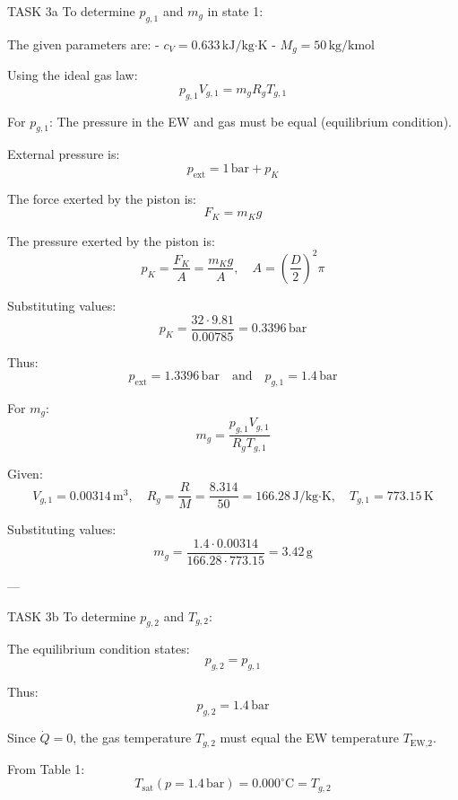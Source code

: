 TASK 3a  
To determine \( p_{g,1} \) and \( m_g \) in state 1:  

The given parameters are:  
- \( c_V = 0.633 \, \text{kJ/kg·K} \)  
- \( M_g = 50 \, \text{kg/kmol} \)  

Using the ideal gas law:  
\[
p_{g,1} V_{g,1} = m_g R_g T_{g,1}
\]  

For \( p_{g,1} \): The pressure in the EW and gas must be equal (equilibrium condition).  

External pressure is:  
\[
p_{\text{ext}} = 1 \, \text{bar} + p_K
\]  

The force exerted by the piston is:  
\[
F_K = m_K g
\]  

The pressure exerted by the piston is:  
\[
p_K = \frac{F_K}{A} = \frac{m_K g}{A}, \quad A = \left(\frac{D}{2}\right)^2 \pi
\]  

Substituting values:  
\[
p_K = \frac{32 \cdot 9.81}{0.00785} = 0.3396 \, \text{bar}
\]  

Thus:  
\[
p_{\text{ext}} = 1.3396 \, \text{bar} \quad \text{and} \quad p_{g,1} = 1.4 \, \text{bar}
\]  

For \( m_g \):  
\[
m_g = \frac{p_{g,1} V_{g,1}}{R_g T_{g,1}}
\]  

Given:  
\[
V_{g,1} = 0.00314 \, \text{m}^3, \quad R_g = \frac{R}{M} = \frac{8.314}{50} = 166.28 \, \text{J/kg·K}, \quad T_{g,1} = 773.15 \, \text{K}
\]  

Substituting values:  
\[
m_g = \frac{1.4 \cdot 0.00314}{166.28 \cdot 773.15} = 3.42 \, \text{g}
\]  

---

TASK 3b  
To determine \( p_{g,2} \) and \( T_{g,2} \):  

The equilibrium condition states:  
\[
p_{g,2} = p_{g,1}
\]  

Thus:  
\[
p_{g,2} = 1.4 \, \text{bar}
\]  

Since \( \dot{Q} = 0 \), the gas temperature \( T_{g,2} \) must equal the EW temperature \( T_{\text{EW,2}} \).  

From Table 1:  
\[
T_{\text{sat}}(p = 1.4 \, \text{bar}) = 0.000^\circ\text{C} = T_{g,2}
\]  